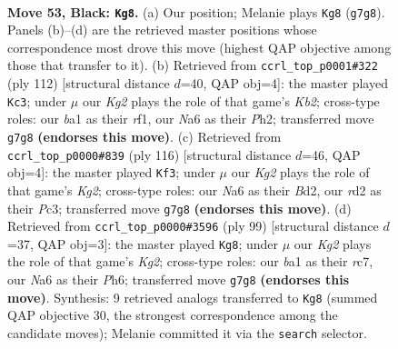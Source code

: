 \documentclass[11pt]{article}
\begin{document}
\clearpage

\begin{figure}[p]\centering
\begin{subfigure}{0.46\textwidth}\centering
\resizebox{\linewidth}{!}{%
\newchessgame
\chessboard[
  setfen={8/4p1k1/npr3pp/pN6/P1p2K2/2P2P2/3R4/B7 b - - 1 53},
  showmover=false,
  pgfstyle=straightmove, color=movearrow, markmove={g7-g8}
]}
\caption{}
\end{subfigure}\hfill
\begin{subfigure}{0.46\textwidth}\centering
\resizebox{\linewidth}{!}{%
\newchessgame
\chessboard[
  setfen={8/p2k1p2/1p2p1p1/1P2P3/P3R2P/8/1KP4P/5r2 w - - 11 57},
  showmover=false,
  pgfstyle=straightmove, color=movearrow, markmove={b2-c3}
]}
\caption{}
\end{subfigure}
\\[4pt]
\begin{subfigure}{0.46\textwidth}\centering
\resizebox{\linewidth}{!}{%
\newchessgame
\chessboard[
  setfen={6k1/4r3/3p1pp1/P1pn3p/7P/2P3P1/R2B1PK1/8 w - - 6 59},
  showmover=false,
  pgfstyle=straightmove, color=movearrow, markmove={g2-f3}
]}
\caption{}
\end{subfigure}\hfill
\begin{subfigure}{0.46\textwidth}\centering
\resizebox{\linewidth}{!}{%
\newchessgame
\chessboard[
  setfen={8/2R3k1/1p3r1p/3bN1p1/P2Ppp2/7P/5PP1/6K1 b - - 1 50},
  showmover=false,
  pgfstyle=straightmove, color=movearrow, markmove={g7-g8}
]}
\caption{}
\end{subfigure}
\caption{\textbf{Move 53, Black: \texttt{Kg8}.} (a) Our position; Melanie plays \texttt{Kg8} (\texttt{g7g8}). Panels (b)--(d) are the retrieved master positions whose correspondence most drove this move (highest QAP objective among those that transfer to it). (b) Retrieved from \texttt{ccrl\_top\_p0001\#322} (ply 112) [structural distance $d$=40, QAP obj=4]: the master played \texttt{Kc3}; under $\mu$ our \emph{Kg2} plays the role of that game's \emph{Kb2}; cross-type roles: our \emph{b}a1 as their \emph{r}f1, our \emph{N}a6 as their \emph{P}h2; transferred move \texttt{g7g8} \textbf{(endorses this move)}. (c) Retrieved from \texttt{ccrl\_top\_p0000\#839} (ply 116) [structural distance $d$=46, QAP obj=4]: the master played \texttt{Kf3}; under $\mu$ our \emph{Kg2} plays the role of that game's \emph{Kg2}; cross-type roles: our \emph{N}a6 as their \emph{B}d2, our \emph{r}d2 as their \emph{P}c3; transferred move \texttt{g7g8} \textbf{(endorses this move)}. (d) Retrieved from \texttt{ccrl\_top\_p0000\#3596} (ply 99) [structural distance $d$=37, QAP obj=3]: the master played \texttt{Kg8}; under $\mu$ our \emph{Kg2} plays the role of that game's \emph{Kg2}; cross-type roles: our \emph{b}a1 as their \emph{r}c7, our \emph{N}a6 as their \emph{P}h6; transferred move \texttt{g7g8} \textbf{(endorses this move)}. Synthesis: 9 retrieved analogs transferred to \texttt{Kg8} (summed QAP objective 30, the strongest correspondence among the candidate moves); Melanie committed it via the \texttt{search} selector.}
\label{fig:thought-m105}
\end{figure}
\end{document}
